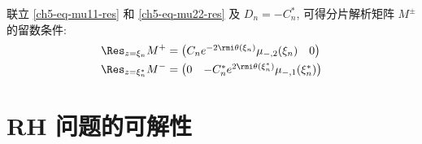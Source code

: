 联立 \eqref{ch5-eq-mu11-res} 和 \eqref{ch5-eq-mu22-res} 及 $D_n = -C_n^*$, 可得分片解析矩阵 $M^{\pm}$ 的留数条件:
\begin{equation}
    \begin{aligned}
        \Res_{z = \xi_{n}} M^{+}     & = \begin{pmatrix}
                                             C_{n} e^{-2\rmi \theta(\xi_{n})} \mu_{-,2}(\xi_{n}) & 0
                                         \end{pmatrix}         \\
        \Res_{z = \xi_{n}^{*}} M^{-} & = \begin{pmatrix}
                                             0 & -C_{n}^{*} e^{2\rmi \theta(\xi_{n}^{*})} \mu_{-,1}(\xi_{n}^{*})
                                         \end{pmatrix}
    \end{aligned}
\end{equation}
\section{RH 问题的可解性}
